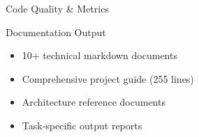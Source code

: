 \documentclass[aspectratio=169, 10pt]{beamer}
\begin{document}
\begin{frame}{Code Quality & Metrics}
    \vspace{0.3cm}
    \begin{alertblock}{Documentation Output}
        \begin{itemize}\setlength{\itemsep}{2pt}
            \item 10+ technical markdown documents
            \item Comprehensive project guide (255 lines)
            \item Architecture reference documents
            \item Task-specific output reports
        \end{itemize}
    \end{alertblock}
\end{frame}

\end{document}
